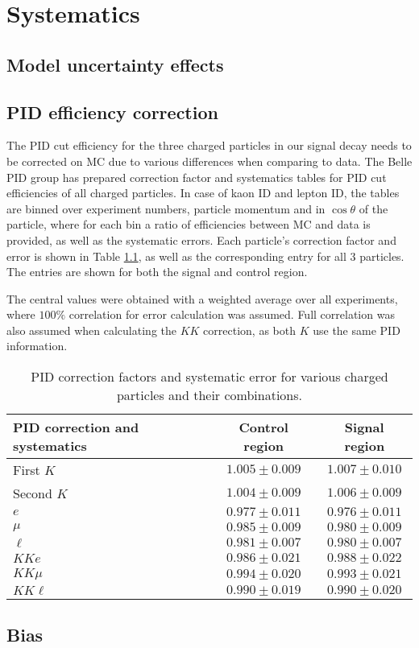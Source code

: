 \chapter{Systematics}
\section{Model uncertainty effects}
\section{PID efficiency correction}

The PID cut efficiency for the three charged particles in our signal decay needs to be corrected on MC due to various differences when comparing to data. The Belle PID group has prepared correction factor and systematics tables for PID cut efficiencies of all charged particles. In case of kaon ID and lepton ID, the tables are binned over experiment numbers, particle momentum and in $\cos\theta$ of the particle, where for each bin a ratio of efficiencies between MC and data is provided, as well as the systematic errors. Each particle's correction factor and error is shown in Table \ref{tab:PID}, as well as the corresponding entry for all 3 particles. The entries are shown for both the signal and control region.

The central values were obtained with a weighted average over all experiments, where $100\%$ correlation for error calculation was assumed. Full correlation was also assumed when calculating the $KK$ correction, as both $K$ use the same PID information.

\begin{table}[H]
	\centering
	\begin{tabular}{|l|c|c|}
		\hline
		PID correction and systematics & Control region & Signal region \\
		\hline
		First $K$ & $1.005\pm 0.009$ & $1.007\pm 0.010$\\
		\hline
		Second $K$ & $1.004\pm 0.009$ & $1.006\pm 0.009$\\
		\hline
		$e$ & $0.977\pm 0.011$ & $0.976\pm 0.011$\\
		\hline
		$\mu$ & $0.985\pm 0.009$ & $0.980\pm 0.009$\\
		\hline
        $\ell$ & $0.981\pm 0.007$ & $0.980\pm 0.007$\\
		\hline
		$KKe$ & $0.986 \pm 0.021$ & $0.988\pm 0.022$\\
		\hline
		$KK\mu$ & $0.994 \pm 0.020$ & $0.993\pm 0.021$\\
		\hline
		$KK\ell$ & $0.990 \pm 0.019$ & $0.990\pm 0.020$\\
		\hline
	\end{tabular}
	\caption{PID correction factors and systematic error for various charged particles and their combinations.}
	\label{tab:PID}
\end{table}

\section{Bias}